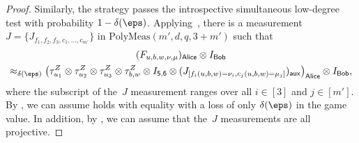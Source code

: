 \documentclass[11pt]{article}
\newcommand{\reg}[1]{{\mathsf{#1}}}
\begin{document}
\begin{proof}
Similarly, the strategy passes the introspective simultaneous low-degree test with probability $1-\delta(\eps)$.
Applying~, there is a measurement $J = \{J_{f_1, f_2, f_3, c_1, \ldots, c_{m'}}\}$ in $\mathrm{PolyMeas}(m',d, q, 3+m')$ such that
\begin{multline}\label{eq:whatevs-tres}
(F_{u, b, w, \nu, \mu})_{\reg{Alice}} \otimes I_{\reg{Bob}}\\
\approx_{\delta(\eps)}
\left(\tau^Z_{u_1} \otimes \tau^Z_{u_2} \otimes \tau^Z_{u_3} \otimes \tau^Z_{b, w}
	\otimes I_{\reg{5,6}} \otimes (J_{[f_i(u, b, w) = \nu_i, c_j(u, b, w) = \mu_j]})_{\reg{aux}}\right)_{\reg{Alice}} \otimes I_{\reg{Bob}},
\end{multline}
where the subscript of the~$J$ measurement ranges over all $i \in [3]$ and $j \in [m']$.
By , we can assume  holds with equality
with a loss of only $\delta(\eps)$ in the game value.
In addition, by , we can assume that the~$J$ measurements are all projective.


\end{proof}
\end{document}
